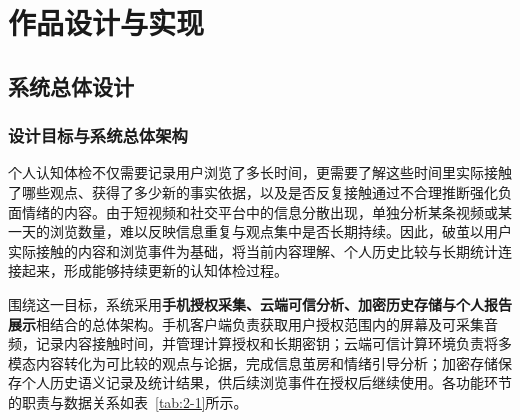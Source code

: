 \FloatBarrier\clearpage

\section{作品设计与实现}\label{chapter:2}

\subsection{系统总体设计}\label{section:2.1}

\subsubsection{设计目标与系统总体架构}\label{section:2.1.1}

个人认知体检不仅需要记录用户浏览了多长时间，更需要了解这些时间里实际接触了哪些观点、获得了多少新的事实依据，以及是否反复接触通过不合理推断强化负面情绪的内容。由于短视频和社交平台中的信息分散出现，单独分析某条视频或某一天的浏览数量，难以反映信息重复与观点集中是否长期持续。因此，破茧以用户实际接触的内容和浏览事件为基础，将当前内容理解、个人历史比较与长期统计连接起来，形成能够持续更新的认知体检过程。

围绕这一目标，系统采用\textbf{手机授权采集、云端可信分析、加密历史存储与个人报告展示}相结合的总体架构。手机客户端负责获取用户授权范围内的屏幕及可采集音频，记录内容接触时间，并管理计算授权和长期密钥；云端可信计算环境负责将多模态内容转化为可比较的观点与论据，完成信息茧房和情绪引导分析；加密存储保存个人历史语义记录及统计结果，供后续浏览事件在授权后继续使用。各功能环节的职责与数据关系如表~\ref{tab:2-1}所示。

